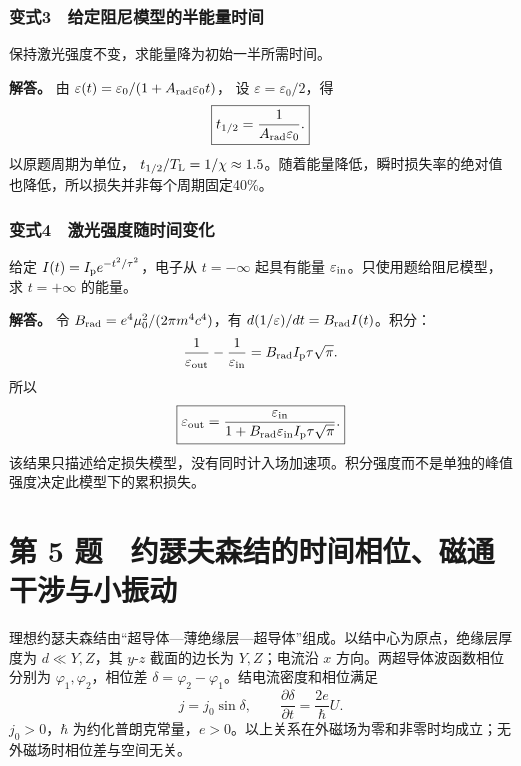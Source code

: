 \documentclass[12pt,a4paper,fontset=fandol]{ctexart}
\begin{document}
\subsubsection{变式3　给定阻尼模型的半能量时间}\label{ux53d8ux5f0f3-ux7ed9ux5b9aux963bux5c3cux6a21ux578bux7684ux534aux80fdux91cfux65f6ux95f4}

保持激光强度不变，求能量降为初始一半所需时间。

\textbf{解答。} 由
\(\varepsilon(t)=\varepsilon_0/(1+A_{\rm rad}\varepsilon_0t)\)， 设
\(\varepsilon=\varepsilon_0/2\)，得 \[
\boxed{t_{1/2}=\frac1{A_{\rm rad}\varepsilon_0}.}
\] 以原题周期为单位，
\(t_{1/2}/T_{\rm L}=1/\chi\approx1.5\)。随着能量降低，瞬时损失率的绝对值也降低，所以损失并非每个周期固定40\%。

\subsubsection{变式4　激光强度随时间变化}\label{ux53d8ux5f0f4-ux6fc0ux5149ux5f3aux5ea6ux968fux65f6ux95f4ux53d8ux5316}

给定 \(I(t)=I_{\rm p}e^{-t^2/\tau^2}\)，电子从 \(t=-\infty\) 起具有能量
\(\varepsilon_{\rm in}\)。只使用题给阻尼模型，求 \(t=+\infty\) 的能量。

\textbf{解答。} 令 \(B_{\rm rad}=e^4\mu_0^2/(2\pi m^4c^4)\)，有
\(d(1/\varepsilon)/dt=B_{\rm rad}I(t)\)。积分： \[
\frac1{\varepsilon_{\rm out}}-\frac1{\varepsilon_{\rm in}}
=B_{\rm rad}I_{\rm p}\tau\sqrt\pi.
\] 所以 \[
\boxed{\varepsilon_{\rm out}=
\frac{\varepsilon_{\rm in}}
{1+B_{\rm rad}\varepsilon_{\rm in}I_{\rm p}\tau\sqrt\pi}.}
\]
该结果只描述给定损失模型，没有同时计入场加速项。积分强度而不是单独的峰值强度决定此模型下的累积损失。

\clearpage

\section{第 5
题　约瑟夫森结的时间相位、磁通干涉与小振动}\label{ux7b2c-5-ux9898-ux7ea6ux745fux592bux68eeux7ed3ux7684ux65f6ux95f4ux76f8ux4f4dux78c1ux901aux5e72ux6d89ux4e0eux5c0fux632fux52a8}

理想约瑟夫森结由``超导体---薄绝缘层---超导体''组成。以结中心为原点，绝缘层厚度为
\(d\ll Y,Z\)，其 \(y\)-\(z\) 截面的边长为 \(Y,Z\)；电流沿 \(x\)
方向。两超导体波函数相位分别为 \(\varphi_1,\varphi_2\)，相位差
\(\delta=\varphi_2-\varphi_1\)。结电流密度和相位满足 \[
j=j_0\sin\delta,\qquad
\frac{\partial\delta}{\partial t}=\frac{2e}{\hbar}U.
\] \(j_0>0\)，\(\hbar\)
为约化普朗克常量，\(e>0\)。以上关系在外磁场为零和非零时均成立；无外磁场时相位差与空间无关。
\end{document}
